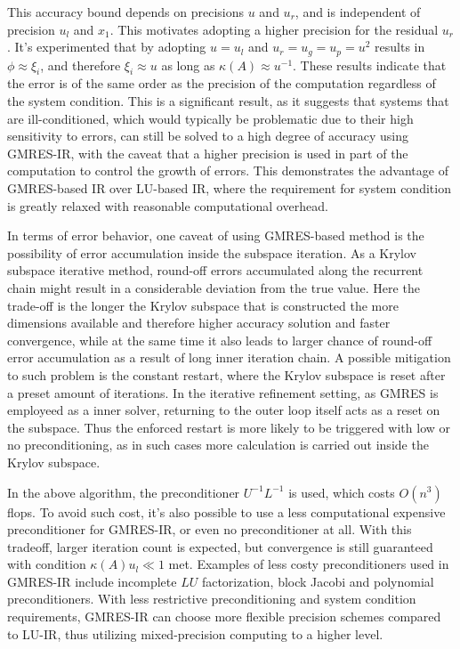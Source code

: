 This accuracy bound depends on precisions $u$ and $u_r$, and is independent of precision $u_l$ and $x_1$. This motivates adopting a higher precision for the residual $u_r$. It's experimented that by adopting $u=u_l$ and $u_r=u_g=u_p=u^2$ results in $\phi \approx \xi_i$, and therefore $\xi_i\approx u$ as long as $\kappa(A)\approx u^{-1}$\cite{Boris2021}. These results indicate that the error is of the same order as the precision of the computation regardless of the system condition. This is a significant result, as it suggests that systems that are ill-conditioned, which would typically be problematic due to their high sensitivity to errors, can still be solved to a high degree of accuracy using GMRES-IR, with the caveat that a higher precision is used in part of the computation to control the growth of errors. This demonstrates the advantage of GMRES-based IR over LU-based IR, where the requirement for system condition is greatly relaxed with reasonable computational overhead. 

In terms of error behavior, one caveat of using GMRES-based method is the possibility of error accumulation inside the subspace iteration. As a Krylov subspace iterative method, round-off errors accumulated along the recurrent chain might result in a considerable deviation from the true value. Here the trade-off is the longer the Krylov subspace that is constructed the more dimensions available and therefore higher accuracy solution and faster convergence, while at the same time it also leads to larger chance of round-off error accumulation as a result of long inner iteration chain. A possible mitigation to such problem is the constant restart, where the Krylov subspace is reset after a preset amount of iterations. In the iterative refinement setting, as GMRES is employeed as a inner solver, returning to the outer loop itself acts as a reset on the subspace. Thus the enforced restart is more likely to be triggered with low or no preconditioning, as in such cases more calculation is carried out inside the Krylov subspace.

In the above algorithm, the preconditioner $U^{-1}L^{-1}$ is used, which costs $O(n^3)$ flops. To avoid such cost, it's also possible to use a less computational expensive preconditioner for GMRES-IR, or even no preconditioner at all. With this tradeoff, larger iteration count is expected, but convergence is still guaranteed with condition $\kappa(A)u_l \ll 1$ met. Examples of less costy preconditioners used in GMRES-IR include incomplete $LU$ factorization, block Jacobi and polynomial preconditioners\cite{Loe2021}. With less restrictive preconditioning and system condition requirements, GMRES-IR can choose more flexible precision schemes compared to LU-IR, thus utilizing mixed-precision computing to a higher level. 

\clearpage




